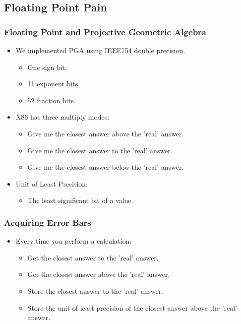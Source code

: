 \documentclass[hyperref={pdfpagemode=FullScreen},aspectratio=169]{beamer}
\begin{document}
\subsection{Floating Point Pain}
\begin{frame}
  \frametitle{Floating Point and Projective Geometric Algebra}
  \begin{itemize}
  \item We implemented PGA using IEEE754 double precision.
    \begin {itemize}
    \item One sign bit.
    \item 11 exponent bits.
    \item 52 fraction bits.
    \end{itemize}
  \item X86 has three multiply modes:
    \begin {itemize}
      \item Give me the closest answer above the 'real' answer.
      \item Give me the closest answer to the 'real' answer.
      \item Give me the closest answer below the 'real' answer.
    \end{itemize}
  \item Unit of Least Precision:
    \begin {itemize}
    \item The least significant bit of a value.
    \end{itemize}
  \end{itemize}
\end{frame}

\begin{frame}
  \frametitle{Acquiring Error Bars}
  \begin{itemize}
  \item Every time you perform a calculation:
    \begin {itemize}
      \item Get the closest answer to the 'real' answer.
      \item Get the closest answer above the 'real' answer.
      \item Store the closest answer to the 'real' answer.
      \item Store the unit of least precision of the closest answer above the 'real' answer.
    \end{itemize}
  \end{itemize}
\end{frame}
\end{document}
